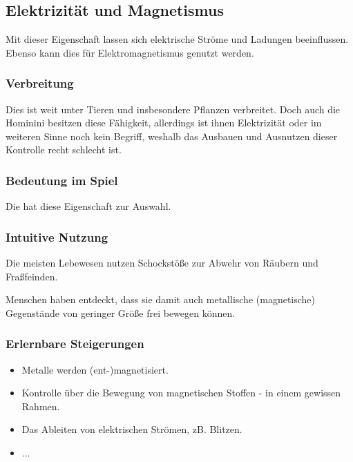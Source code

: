 \subsection{Elektrizität und Magnetismus}\label{sec:elektromagie}
Mit dieser Eigenschaft lassen sich elektrische Ströme und Ladungen beeinflussen. Ebenso kann dies für Elektromagnetismus genutzt werden.

\subsubsection{Verbreitung}
Dies ist weit unter Tieren und insbesondere Pflanzen verbreitet. Doch auch die Hominini besitzen diese Fähigkeit, allerdings ist ihnen Elektrizität oder im weiteren Sinne noch kein Begriff, weshalb das Ausbauen und Ausnutzen dieser Kontrolle recht schlecht ist.

\subsubsection{Bedeutung im Spiel}
Die  hat diese Eigenschaft zur Auswahl. 

\subsubsection{Intuitive Nutzung}
Die meisten Lebewesen nutzen Schockstöße zur Abwehr von Räubern und Fraßfeinden.  

Menschen haben entdeckt, dass sie damit auch metallische (magnetische) Gegenstände von geringer Größe frei bewegen können.

\subsubsection{Erlernbare Steigerungen}
\begin{itemize}
	\item Metalle werden (ent-)magnetisiert.
	\item Kontrolle über die Bewegung von magnetischen Stoffen - in einem gewissen Rahmen.
	\item Das Ableiten von elektrischen Strömen, zB. Blitzen.
	\item ...
\end{itemize}

